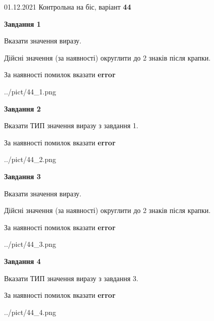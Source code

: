\documentclass[11pt, ukrainian]{article}
\begin{document}
{01.12.2021 Контрольна на біс, варіант  \No \textbf { 44 }\par}
{
\begin {large}
{\begin {center}\textbf{Завдання 1}\end {center}}\par
Вказати значення виразу. \par
Дійсні значення (за наявності) округлити до 2 знаків після крапки. \par
За наявності помилок вказати \textbf{error}

\begin{center}
	{../pict/44_1.png}
\end{center}
\newpage

{\begin {center}\textbf{Завдання 2}\end {center}}\par
Вказати ТИП значення виразу з завдання 1. \par
За наявності помилок вказати \textbf{error}

\begin{center}
	{../pict/44_2.png}
\end{center}
\newpage

{\begin {center}\textbf{Завдання 3}\end {center}}\par
Вказати значення виразу. \par
Дійсні значення (за наявності) округлити до 2 знаків після крапки. \par
За наявності помилок вказати \textbf{error}

\begin{center}
	{../pict/44_3.png}
\end{center}
\newpage

{\begin {center}\textbf{Завдання 4}\end {center}}\par
Вказати ТИП значення виразу з завдання 3. \par
За наявності помилок вказати \textbf{error}

\begin{center}
	{../pict/44_4.png}
\end{center}
\newpage


\end{large}}
\end{document}
